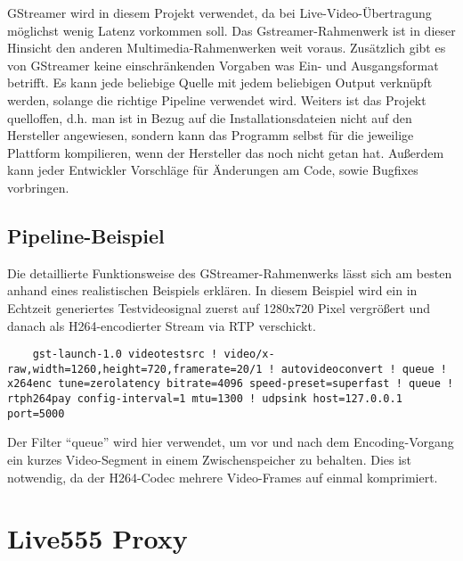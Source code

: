 GStreamer wird in diesem Projekt verwendet, da bei Live-Video-Übertragung möglichst wenig Latenz vorkommen soll.
Das Gstreamer-Rahmenwerk ist in dieser Hinsicht den anderen Multimedia-Rahmenwerken weit voraus.
Zusätzlich gibt es von GStreamer keine einschränkenden Vorgaben was Ein- und Ausgangsformat betrifft.
Es kann jede beliebige Quelle mit jedem beliebigen Output verknüpft werden, solange die richtige Pipeline verwendet wird.
Weiters ist das Projekt quelloffen, d.h. man ist in Bezug auf die Installationsdateien nicht auf den Hersteller angewiesen, sondern kann das Programm selbst für die jeweilige Plattform kompilieren, wenn der Hersteller das noch nicht getan hat.
Außerdem kann jeder Entwickler Vorschläge für Änderungen am Code, sowie Bugfixes vorbringen.
\subsection{Pipeline-Beispiel}
Die detaillierte Funktionsweise des GStreamer-Rahmenwerks lässt sich am besten anhand eines realistischen Beispiels erklären.
In diesem Beispiel wird ein in Echtzeit generiertes Testvideosignal zuerst auf 1280x720 Pixel vergrößert und danach als H264-encodierter Stream via RTP verschickt.
\begin{lstlisting}
    gst-launch-1.0 videotestsrc ! video/x-raw,width=1260,height=720,framerate=20/1 ! autovideoconvert ! queue ! x264enc tune=zerolatency bitrate=4096 speed-preset=superfast ! queue ! rtph264pay config-interval=1 mtu=1300 ! udpsink host=127.0.0.1 port=5000
\end{lstlisting}
Der Filter \enquote{queue} wird hier verwendet, um vor und nach dem Encoding-Vorgang ein kurzes Video-Segment in einem Zwischenspeicher zu behalten. Dies ist notwendig, da der H264-Codec mehrere Video-Frames auf einmal komprimiert.
\section{Live555 Proxy}